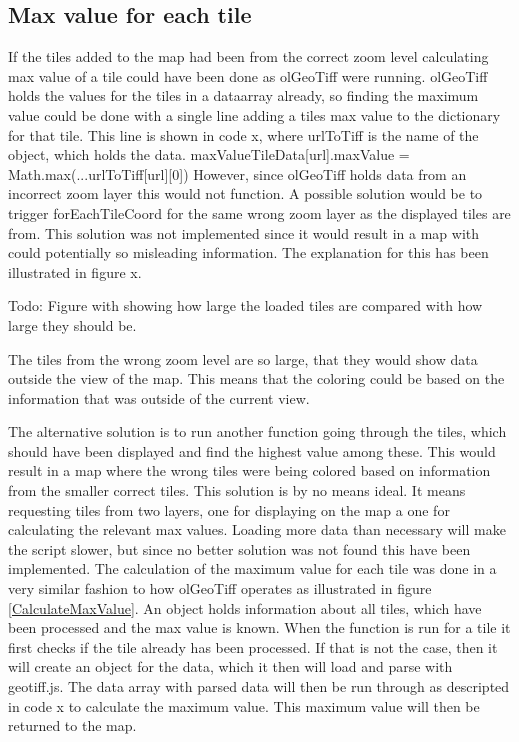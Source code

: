 \subsection{Max value for each tile}
If the tiles added to the map had been from the correct zoom level calculating max value of a tile could have been done as olGeoTiff were running. olGeoTiff holds the values for the tiles in a dataarray already, so finding the maximum value could be done with a single line adding a tiles max value to the dictionary for that tile. This line is shown in code x, where urlToTiff is the name of the object, which holds the data.
maxValueTileData[url].maxValue = Math.max(...urlToTiff[url][0])
However, since olGeoTiff holds data from an incorrect zoom layer this would not function. A possible solution would be to trigger forEachTileCoord for the same wrong zoom layer as the displayed tiles are from. This solution was not implemented since it would result in a map with could potentially so misleading information. The explanation for this has been illustrated in figure x. 

Todo: Figure with showing how large the loaded tiles are compared with how large they should be.

The tiles from the wrong zoom level are so large, that they would show data outside the view of the map. This means that the coloring could be based on the information that was outside of the current view.

The alternative solution is to run another function going through the tiles, which should have been displayed and find the highest value among these. This would result in a map where the wrong tiles were being colored based on information from the smaller correct tiles. This solution is by no means ideal. It means requesting tiles from two layers, one for displaying on the map a one for calculating the relevant max values. Loading more data than necessary will make the script slower, but since no better solution was not found this have been implemented.
The calculation of the maximum value for each tile was done in a very similar fashion to how olGeoTiff operates as illustrated in figure \ref{CalculateMaxValue}. An object holds information about all tiles, which have been processed and the max value is known. When the function is run for a tile it first checks if the tile already has been processed. If that is not the case, then it will create an object for the data, which it then will load and parse with geotiff.js. The data array with parsed data will then be run through as descripted in code x to calculate the maximum value. This maximum value will then be returned to the map. 



